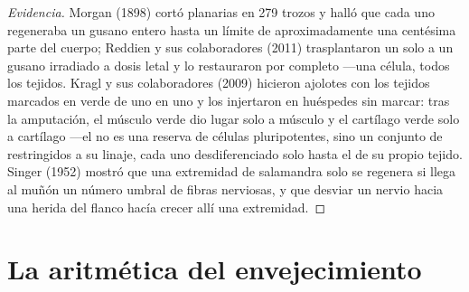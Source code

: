 \begin{proof}[Evidencia]
Morgan (1898) cortó planarias en 279 trozos y halló que cada uno
regeneraba un gusano entero hasta un límite de aproximadamente una
centésima parte del cuerpo; Reddien y sus colaboradores (2011)
trasplantaron un solo  a un gusano irradiado a dosis letal y
lo restauraron por completo ---una célula, todos los tejidos. Kragl y
sus colaboradores (2009) hicieron ajolotes con los tejidos marcados en
verde de uno en uno y los injertaron en huéspedes sin marcar: tras la
amputación, el músculo verde dio lugar solo a músculo y el cartílago
verde solo a cartílago ---el  no es una reserva de células
pluripotentes, sino un conjunto de  restringidos a su
linaje, cada uno desdiferenciado solo hasta el  de su propio
tejido. Singer (1952) mostró que una extremidad de salamandra solo se
regenera si llega al muñón un número umbral de fibras nerviosas, y que
desviar un nervio hacia una herida del flanco hacía crecer allí una
extremidad.
\end{proof}

\section{La aritmética del envejecimiento}

